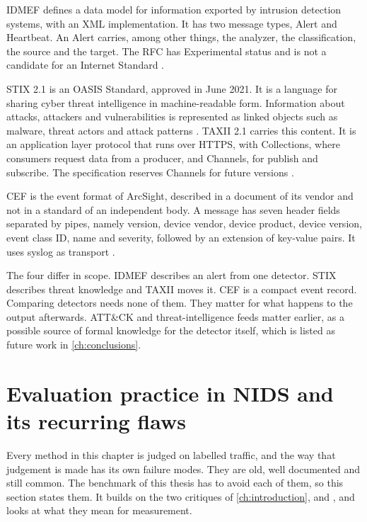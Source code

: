 IDMEF defines a data model for information exported by intrusion detection
systems, with an XML implementation. It has two message types, Alert and
Heartbeat. An Alert carries, among other things, the analyzer, the
classification, the source and the target. The RFC has Experimental status
and is not a candidate for an Internet Standard \citep{debar2007rfc4765}.

STIX 2.1 is an OASIS Standard, approved in June 2021. It is a language for
sharing cyber threat intelligence in machine-readable form. Information about
attacks, attackers and vulnerabilities is represented as linked objects such
as malware, threat actors and attack patterns \citep{jordan2021stix}.
TAXII 2.1 carries this content. It is an application layer protocol that runs
over HTTPS, with Collections, where consumers request data from a producer,
and Channels, for publish and subscribe. The specification reserves Channels
for future versions \citep{jordan2021taxii}.

CEF is the event format of ArcSight, described in a document of its
vendor and not in a standard of an independent body. A message has seven
header fields separated by pipes, namely version, device vendor, device
product, device version, event class ID, name and severity, followed by an
extension of key-value pairs. It uses syslog as transport
\citep{opentext2023cef}.

The four differ in scope. IDMEF describes an alert from one detector. STIX
describes threat knowledge and TAXII moves it. CEF is a compact event record.
Comparing detectors needs none of them. They matter for what happens to the
output afterwards. ATT\&CK and threat-intelligence feeds matter earlier, as a
possible source of formal knowledge for the detector itself, which is listed
as future work in \cref{ch:conclusions}.

\section{Evaluation practice in NIDS and its recurring flaws}
\label{sec:evaluation-practice}

Every method in this chapter is judged on labelled traffic, and the way that
judgement is made has its own failure modes. They are old, well documented
and still common. The benchmark of this thesis has to avoid each of them, so
this section states them. It builds on the two critiques of
\cref{ch:introduction}, \citet{sommer2010outside} and
\citet{arp2022dosdonts}, and looks at what they mean for measurement.

